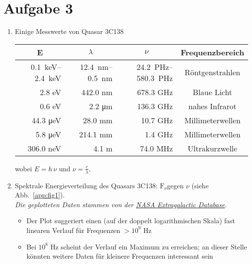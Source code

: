 \documentclass[11pt,a4paper]{scrartcl}
\newcommand{\head}[1]{\multicolumn{1}{c}{#1}}
\newcommand*{\figref}[1]{(siehe Abb.~\ref{#1})}
\newcommand{\Fnu}{\ensuremath{\mathrm{F}_{\nu}}}
\begin{document}
\section*{Aufgabe 3}

\begin{enumerate}[label=\textbf{\large(\alph*)}]

\item
Einige Messwerte von Quasar 3C138

\begin{table}[h]
\centering
\begin{tabular}{rrrc}
    \toprule
    \head{E} & \head{$\lambda$} & \head{$\nu$} & \head{Frequenzbereich} \\
    \midrule
    \SIrange{0.1}{2.4}{\kilo\electronvolt} & \SIrange{12.4}{0.5}{\nano\metre} &
    \SIrange{24.2}{580.3}{\peta\hertz} & Röntgenstrahlen \\
    2.8 \si{\electronvolt} & 442.0 \si{\nano\metre} & 678.3 \si{\giga\hertz} &
    Blaue Licht \\
    0.6 \si{\electronvolt} & 2.2 \si{\micro\metre} & 136.3 \si{\giga\hertz} &
    nahes Infrarot \\
    44.3 \si{\micro\electronvolt} & 28.0 \si{\milli\metre} & 10.7 \si{\giga\hertz}
    &  Millimeterwellen \\
    5.8 \si{\micro\electronvolt} & 214.1 \si{\milli\metre} & 1.4 \si{\giga\hertz}
    & Millimeterwellen \\
    306.0 \si{\nano\electronvolt} & 4.1 \si{\metre} & 74.0 \si{\mega\hertz} &
    Ultrakurzwelle \\
    \bottomrule
\end{tabular}
\label{tab:tab1}
\end{table}

wobei $E = h\,\nu$ und $\nu = \frac{c}{\lambda}$.

\vspace*{\baselineskip}

\item
Spektrale Energieverteilung des Quasars 3C138: \Fnu gegen
$\nu$ \figref{app:fig1}. \\
\textit{\small Die geplotteten Daten stammen von der
    \href{https://ned.ipac.caltech.edu/}{NASA Extragalactic Database}.}

    \begin{itemize}
        \item Der Plot suggeriert einen (auf der doppelt logarithmischen
            Skala) fast linearen Verlauf für Frequenzen $>10^9$ \si{\hertz}
        \item Bei $10^8$ \si{\hertz} scheint der Verlauf ein Maximum zu
            erreichen; an dieser Stelle könnten weitere Daten für kleinere
            Frequenzen interessant sein
    \end{itemize}


\end{enumerate}
\end{document}
